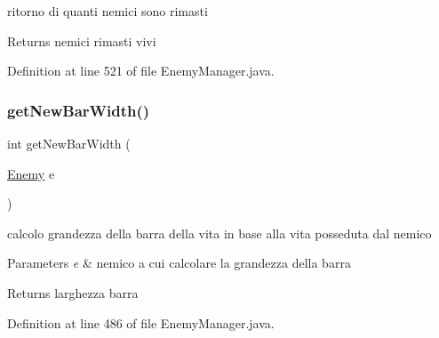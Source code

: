 ritorno di quanti nemici sono rimasti 

\begin{DoxyReturn}{Returns}
nemici rimasti vivi 
\end{DoxyReturn}


Definition at line 521 of file Enemy\+Manager.\+java.

\mbox{\label{classmanagers_1_1_enemy_manager_ac01087314c8b4df0d2304a3596493393}} 
\subsubsection{\texorpdfstring{get\+New\+Bar\+Width()}{getNewBarWidth()}}
{\footnotesize\ttfamily int get\+New\+Bar\+Width (\begin{DoxyParamCaption}\item[{\hyperlink{classenemies_1_1_enemy}{Enemy}}]{e }\end{DoxyParamCaption})\hspace{0.3cm}{\ttfamily [private]}}



calcolo grandezza della barra della vita in base alla vita posseduta dal nemico 


\begin{DoxyParams}{Parameters}
{\em e} & nemico a cui calcolare la grandezza della barra\\
\hline
\end{DoxyParams}
\begin{DoxyReturn}{Returns}
larghezza barra 
\end{DoxyReturn}


Definition at line 486 of file Enemy\+Manager.\+java.

